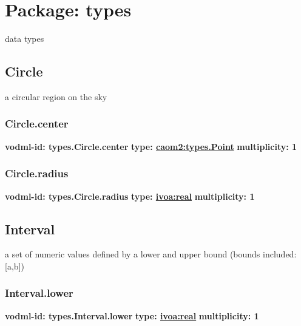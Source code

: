 \pagebreak
\section{Package: types }


  data types

  \subsection{Circle}
  \label{sect:types.Circle}
    a circular region on the sky

    \subsubsection{Circle.center}
      \textbf{vodml-id: types.Circle.center} \newline
      \textbf{type: \hyperref[sect:types.Point]{caom2:types.Point}} \newline
      \textbf{multiplicity: 1} 

    \subsubsection{Circle.radius}
      \textbf{vodml-id: types.Circle.radius} \newline
      \textbf{type: \hyperref[sect:ivoa]{ivoa:real}} \newline
      \textbf{multiplicity: 1} 

  \subsection{Interval}
  \label{sect:types.Interval}
    a set of numeric values defined by a lower and upper bound (bounds included: [a,b])

    \subsubsection{Interval.lower}
      \textbf{vodml-id: types.Interval.lower} \newline
      \textbf{type: \hyperref[sect:ivoa]{ivoa:real}} \newline
      \textbf{multiplicity: 1} 

